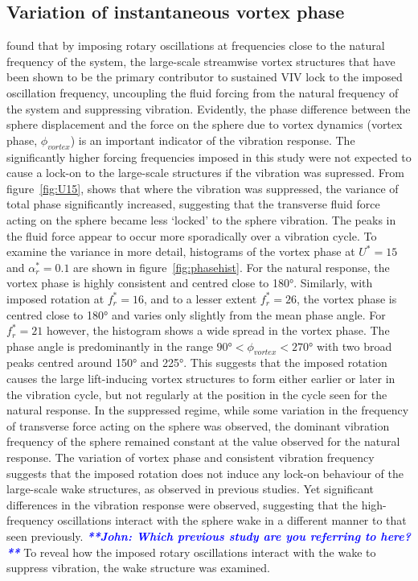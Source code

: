 \documentclass[3p]{elsarticle}
\newcommand{\Ustar}{\ensuremath{U^{*}}}
\newcommand{\velrat}{\ensuremath{\alpha_r^*}}
\newcommand{\freqrat}{\ensuremath{f_r^*}}
\newcommand{\js}[1]{{\textcolor{blue}{{\bf{\it{ **John: #1 **}}}}}}
\begin{document}
\subsection{Variation of instantaneous vortex phase}
\citet{Sareen2018b,Sareen2019} found that by imposing rotary
oscillations at frequencies close to the natural frequency of the
system, the large-scale streamwise vortex structures that have been
shown to be the primary contributor to sustained VIV
\citep{Govardhan2005} lock to the imposed oscillation frequency,
uncoupling the fluid forcing from the natural frequency of the system
and suppressing vibration. Evidently, the phase difference between the sphere
displacement and the force on the sphere due to vortex dynamics
(vortex phase, $\phi_{vortex}$)  is an important indicator of the
vibration response. The significantly higher forcing
frequencies imposed in this study were not expected to cause a lock-on 
to the large-scale structures if the vibration was supressed. From figure~\ref{fig:U15}, shows that where the vibration was suppressed, the variance of total phase
significantly increased, suggesting that the transverse fluid force
acting on the sphere became less `locked' to the sphere vibration.
The peaks in the fluid force appear to occur more sporadically over a
vibration cycle. To examine the variance in more detail, histograms of
the vortex phase at $\Ustar=15$ and $\velrat=0.1$ are shown in
figure~\ref{fig:phasehist}. For the natural response, the vortex phase
is highly consistent and centred close to \ang{180}. Similarly, with
imposed rotation at $\freqrat=16$, and to a lesser extent
$\freqrat=26$, the vortex phase is centred close to \ang{180} and
varies only slightly from the mean phase angle. For $\freqrat=21$
however, the histogram shows a wide spread in the vortex phase. The
phase angle is predominantly in the range
$\ang{90} < \phi_{vortex} < \ang{270}$ with two broad peaks centred
around \ang{150} and \ang{225}. This suggests that the
imposed rotation causes the large lift-inducing vortex structures to
form either earlier or later in the vibration cycle, but not regularly
at the position in the cycle seen for the natural response.
In the suppressed regime, while some variation in the
frequency of transverse force acting on the sphere was observed, the
dominant vibration frequency of the sphere remained constant at the
value observed for the natural response. The variation of vortex phase
and consistent vibration frequency suggests
that the imposed rotation does not induce any lock-on behaviour of the
large-scale wake structures, as observed in previous studies. Yet
significant differences in the vibration response were observed,
suggesting that the high-frequency oscillations interact with the
sphere wake in a different manner to that seen previously. \js{Which previous study are you referring to here?} To reveal
how the imposed rotary oscillations interact with the wake to suppress
vibration, the wake structure was examined.
\end{document}
